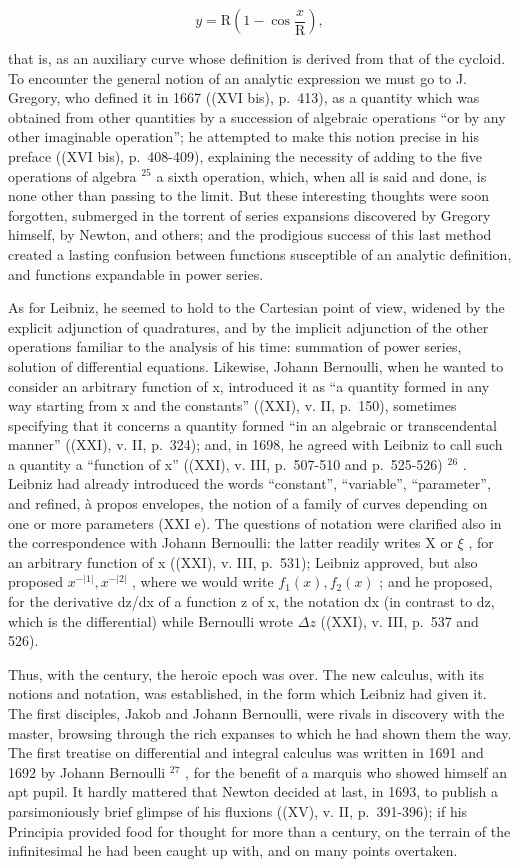 \[
y = \mathrm{R} \left(1 - \cos {\frac {x}{\mathrm{R}}}\right),
\]

that is, as an auxiliary curve whose definition is derived from that of the cycloid. To encounter the general notion of an analytic expression we must go to J. Gregory, who defined it in 1667 ((XVI bis), p.~413), as a quantity which was obtained from other quantities by a succession of algebraic operations ``or by any other imaginable operation''; he attempted to make this notion precise in his preface ((XVI bis), p.~408-409), explaining the necessity of adding to the five operations of algebra \(^{25}\) a sixth operation, which, when all is said and done, is none other than passing to the limit. But these interesting thoughts were soon forgotten, submerged in the torrent of series expansions discovered by Gregory himself, by Newton, and others; and the prodigious success of this last method created a lasting confusion between functions susceptible of an analytic definition, and functions expandable in power series.

As for Leibniz, he seemed to hold to the Cartesian point of view, widened by the explicit adjunction of quadratures, and by the implicit adjunction of the other operations familiar to the analysis of his time: summation of power series, solution of differential equations. Likewise, Johann Bernoulli, when he wanted to consider an arbitrary function of x, introduced it as ``a quantity formed in any way starting from x and the constants'' ((XXI), v. II, p.~150), sometimes specifying that it concerns a quantity formed ``in an algebraic or transcendental manner'' ((XXI), v. II, p.~324); and, in 1698, he agreed with Leibniz to call such a quantity a ``function of x'' ((XXI), v. III, p.~507-510 and p.~525-526) \(^{26}\) . Leibniz had already introduced the words ``constant'', ``variable'', ``parameter'', and refined, à propos envelopes, the notion of a family of curves depending on one or more parameters (XXI e). The questions of notation were clarified also in the correspondence with Johann Bernoulli: the latter readily writes X or \(\xi\) , for an arbitrary function of x ((XXI), v. III, p.~531); Leibniz approved, but also proposed \(x^{-|1|}, x^{-|2|}\) , where we would write \(f_{1}(x), f_{2}(x)\) ; and he proposed, for the derivative dz/dx of a function z of x, the notation dx (in contrast to dz, which is the differential) while Bernoulli wrote \(\Delta z\) ((XXI), v. III, p.~537 and 526).

Thus, with the century, the heroic epoch was over. The new calculus, with its notions and notation, was established, in the form which Leibniz had given it. The first disciples, Jakob and Johann Bernoulli, were rivals in discovery with the master, browsing through the rich expanses to which he had shown them the way. The first treatise on differential and integral calculus was written in 1691 and 1692 by Johann Bernoulli \(^{27}\) , for the benefit of a marquis who showed himself an apt pupil. It hardly mattered that Newton decided at last, in 1693, to publish a parsimoniously brief glimpse of his fluxions ((XV), v. II, p.~391-396); if his Principia provided food for thought for more than a century, on the terrain of the infinitesimal he had been caught up with, and on many points overtaken.

